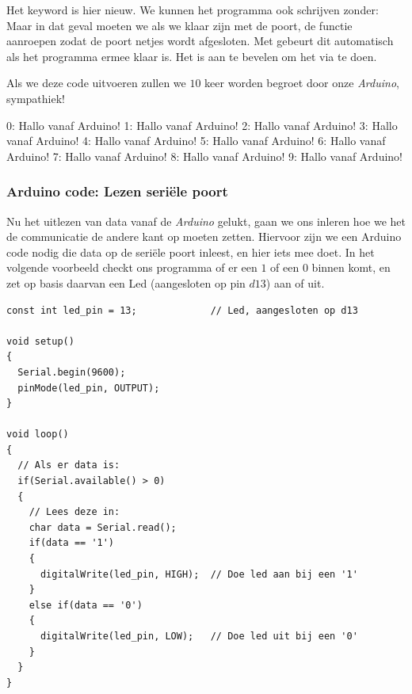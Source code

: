 Het keyword  is hier nieuw. We kunnen het programma ook schrijven zonder:
Maar in dat geval moeten we als we klaar zijn met de poort, de functie  aanroepen zodat de poort netjes wordt afgesloten. Met  gebeurt dit automatisch als het programma ermee klaar is. Het is aan te bevelen om het via  te doen. \newline

Als we deze code uitvoeren zullen we $10$ keer worden begroet door onze \textit{Arduino}, sympathiek!
\begin{python}
0: Hallo vanaf Arduino!
1: Hallo vanaf Arduino!
2: Hallo vanaf Arduino!
3: Hallo vanaf Arduino!
4: Hallo vanaf Arduino!
5: Hallo vanaf Arduino!
6: Hallo vanaf Arduino!
7: Hallo vanaf Arduino!
8: Hallo vanaf Arduino!
9: Hallo vanaf Arduino!
\end{python}

\subsubsection{Arduino code: Lezen seriële poort}

Nu het uitlezen van data vanaf de \textit{Arduino} gelukt, gaan we ons inleren hoe we het de communicatie de andere kant op moeten zetten. Hiervoor zijn we een Arduino code nodig die data op de seriële poort inleest, en hier iets mee doet. In het volgende voorbeeld checkt ons programma of er een $1$ of een $0$ binnen komt, en zet op basis daarvan een Led (aangesloten op pin $d13$) aan of uit. 

\newpage 

\begin{lstlisting}[language=Arduino, basicstyle=\ttfamily\footnotesize]
const int led_pin = 13;             // Led, aangesloten op d13

void setup() 
{
  Serial.begin(9600);
  pinMode(led_pin, OUTPUT);
}

void loop() 
{
  // Als er data is:
  if(Serial.available() > 0)
  {
    // Lees deze in:
    char data = Serial.read();
    if(data == '1')
    {
      digitalWrite(led_pin, HIGH);  // Doe led aan bij een '1'
    }
    else if(data == '0')
    {
      digitalWrite(led_pin, LOW);   // Doe led uit bij een '0'
    }
  }
}
\end{lstlisting}


